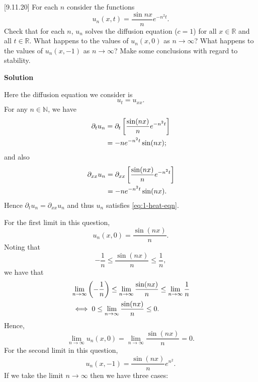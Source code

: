 \documentclass{article}
\begin{document}
\vspace{5mm}

[9.11.20] For each $n$ consider the functions
%
\begin{equation*}
    u_n(x, t) = \frac{\sin n x}{n} e^{-n^2 t}
    .
\end{equation*}
%
Check that for each $n$, $u_n$ solves the diffusion equation ($c = 1$)
for all $x \in \mathbb{R}$ and all $t \in \mathbb{R}$. What happens to
the values of $u_n(x, 0)$ as $n \to \infty$? What happens to
the values of $u_n(x, -1)$ as $n \to \infty$? Make some conclusions with
regard to stability.

\textbf{Solution}

Here the diffusion equation we consider is
%
\begin{equation}
    u_t = u_{xx}
    .
    \label{eq:1-heat-eqn}
\end{equation}
%
For any $n \in \mathbb{N}$, we have
%
\begin{align*}
    \partial_t u_n
        &= \partial_t \sbr{\frac{\sin(n x)}{n} e^{-n^2 t}} \\
        &= - n e^{-n^2 t} \sin(n x)
        ;
\end{align*}
%
and also
%
\begin{align*}
    \partial_{xx} u_n
        &= \partial_{xx} \sbr{\frac{\sin(n x)}{n} e^{-n^2 t}} \\
        &= - n e^{-n^2 t} \sin(n x)
        .
\end{align*}
%
Hence $\partial_t u_n = \partial_{xx} u_n$ and thus $u_n$ satisfies
\eqref{eq:1-heat-eqn}.

For the first limit in this question,
%
\begin{equation*}
    u_n(x, 0) = \frac{\sin(n x)}{n}
    .
\end{equation*}
%
Noting that
%
\begin{equation*}
    - \frac{1}{n} \leq \frac{\sin(n x)}{n} \leq \frac{1}{n}
    ,
\end{equation*}
%
we have that
%
\begin{align*}
    &\lim_{n \to \infty} \del{- \frac{1}{n}}
    \leq \lim_{n \to \infty} \frac{\sin(n x)}{n}
    \leq \lim_{n \to \infty} \frac{1}{n} \\
    &\iff 0 \leq \lim_{n \to \infty} \frac{\sin(n x)}{n} \leq 0
    .
\end{align*}
%
Hence,
%
\begin{equation*}
    \lim_{n \to \infty} u_n(x, 0) = \lim_{n \to \infty} \frac{\sin(n x)}{n} = 0
    .
\end{equation*}
%
For the second limit in this question,
%
\begin{equation*}
    u_n(x, -1) = \frac{\sin(n x)}{n} e^{n^2}
    .
\end{equation*}
%
If we take the limit $n \to \infty$ then we have three cases:
\end{document}
